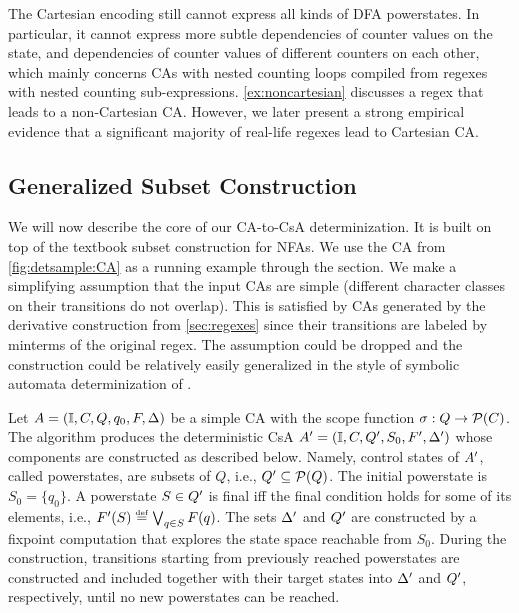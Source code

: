 \documentclass[acmsmall,screen]{acmart}
\begin{document}
The Cartesian encoding still cannot express all kinds of DFA powerstates.
%
In particular, it cannot express more subtle dependencies of counter values on the state, and dependencies of counter values of different
counters on each other, which mainly concerns CAs with nested counting loops
compiled from regexes with nested counting sub-expressions. 
%
\cref{ex:noncartesian} discusses a regex that leads to a non-Cartesian CA. 
%
However, we later present a strong empirical evidence that a significant
majority of real-life regexes lead to Cartesian CA. 

\subsection{Generalized Subset Construction}\label{sec:subscons}

We will now describe the core of our CA-to-CsA determinization.
%
It is built on top of the textbook subset construction for NFAs.
%
We use the CA from \cref{fig:detsample:CA} as a running example through the
section.
%
We make a simplifying assumption that the input CAs are simple (different
character classes on their transitions do not overlap). This is satisfied by CAs
generated by the derivative construction from \cref{sec:regexes} since their transitions are labeled by minterms of the original regex. 
%
The assumption could be dropped and the construction could be relatively easily generalized in the style of symbolic automata determinization of \cite{SFAdeterm}.


Let $A=(\mathbb{I},C,Q,q_0,F,\Delta)$ be a simple 
CA with the scope function
$\sigma:Q\rightarrow\mathcal{P}(C)$. 
%
The algorithm produces the deterministic CsA
$A'=(\mathbb{I},C,Q',S_0,F',\Delta')$ whose components are constructed
as described below.
%
Namely, control states of $A'$, called powerstates, are subsets of $Q$,
i.e., $Q' \subseteq \mathcal{P}(Q)$.
%
The initial powerstate is $S_0 = \{q_0\}$.
%
A powerstate $S\in Q'$ is final iff the final condition holds for some of
its elements, i.e., $\CS{F}(S)\eqdef\bigvee_{q\in S} F(q)$.
%
The sets $\Delta'$ and $Q'$ are constructed by a fixpoint computation
that explores the state space reachable from $S_0$.
%
During the construction, transitions starting from previously reached
powerstates are constructed and included together with their target states into
$\Delta'$ and $Q'$, respectively, until no new powerstates can be
reached.  
\end{document}
